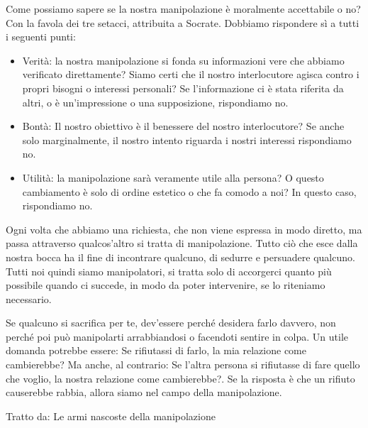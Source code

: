 \documentclass[12pt]{book} %
\begin{document}
\bigskip

Come possiamo sapere se la nostra manipolazione è moralmente accettabile o no? Con la favola dei tre setacci,
attribuita a Socrate. Dobbiamo rispondere sì a tutti i seguenti punti: 

\begin{itemize}
\item Verità: la nostra manipolazione si fonda su informazioni vere che abbiamo verificato direttamente? Siamo certi che
il nostro interlocutore agisca contro i propri bisogni o interessi personali? Se l'informazione ci
è stata riferita da altri, o è un'impressione o una supposizione, rispondiamo no. 
\item Bontà: Il nostro obiettivo è il benessere del nostro interlocutore? Se anche solo marginalmente, il nostro intento
riguarda i nostri interessi rispondiamo no. 
\item Utilità: la manipolazione sarà veramente utile alla persona? O questo cambiamento è solo di ordine estetico o che
fa comodo a noi? In questo caso, rispondiamo no. 
\end{itemize}

\bigskip

Ogni volta che abbiamo una richiesta, che non viene espressa in modo diretto, ma passa attraverso
qualcos'altro si tratta di manipolazione. Tutto ciò che esce dalla nostra bocca ha il fine di
incontrare qualcuno, di sedurre e persuadere qualcuno. Tutti noi quindi siamo manipolatori, si tratta solo di
accorgerci quanto più possibile quando ci succede, in modo da poter intervenire, se lo riteniamo necessario.

Se qualcuno si sacrifica per te, dev'essere perché desidera farlo davvero, non perché poi può
manipolarti arrabbiandosi o facendoti sentire in colpa. Un utile domanda potrebbe essere: Se rifiutassi di farlo, la
mia relazione come cambierebbe? Ma anche, al contrario: Se l'altra persona si rifiutasse di fare
quello che voglio, la nostra relazione come cambierebbe?. Se la risposta è che un rifiuto causerebbe rabbia, allora
siamo nel campo della manipolazione.

\bigskip

Tratto da: Le armi nascoste della manipolazione
\end{document}
